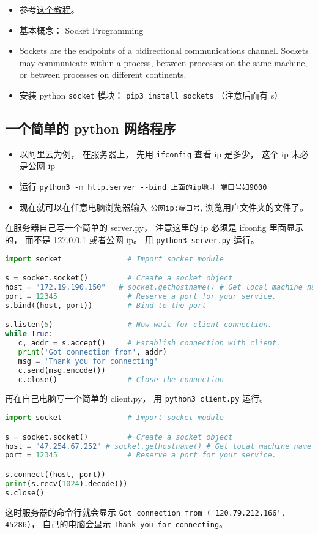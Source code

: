 
\begin{itemize}
\item 参考\href{https://www.tutorialspoint.com/python/python_networking.htm}{这个教程}。
\item 基本概念： Socket Programming
\item Sockets are the endpoints of a bidirectional communications channel. Sockets may communicate within a process, between processes on the same machine, or between processes on different continents.
\item 安装 python \verb`socket` 模块： \verb`pip3 install sockets` （注意后面有 s）
\end{itemize}

\subsection{一个简单的 python 网络程序}
\begin{itemize}
\item 以阿里云为例， 在服务器上， 先用 \verb`ifconfig` 查看 ip 是多少， 这个 ip 未必是公网 ip
\item 运行 \verb`python3 -m http.server --bind 上面的ip地址 端口号如9000`
\item 现在就可以在任意电脑浏览器输入 \verb`公网ip:端口号`, 浏览用户文件夹的文件了。
\end{itemize}

在服务器自己写一个简单的 server.py， 注意这里的 ip 必须是 ifconfig 里面显示的， 而不是 127.0.0.1 或者公网 ip。 用 \verb`python3 server.py` 运行。
\begin{lstlisting}[language=python, caption=server.py]
import socket               # Import socket module

s = socket.socket()         # Create a socket object
host = "172.19.190.150"   # socket.gethostname() # Get local machine name
port = 12345                # Reserve a port for your service.
s.bind((host, port))        # Bind to the port

s.listen(5)                 # Now wait for client connection.
while True:
   c, addr = s.accept()     # Establish connection with client.
   print('Got connection from', addr)
   msg = 'Thank you for connecting'
   c.send(msg.encode())
   c.close()                # Close the connection
\end{lstlisting}

再在自己电脑写一个简单的 client.py， 用 \verb`python3 client.py` 运行。
\begin{lstlisting}[language=python, caption=client.py]
import socket               # Import socket module

s = socket.socket()         # Create a socket object
host = "47.254.67.252" # socket.gethostname() # Get local machine name
port = 12345                # Reserve a port for your service.

s.connect((host, port))
print(s.recv(1024).decode())
s.close()
\end{lstlisting}

这时服务器的命令行就会显示 \verb`Got connection from ('120.79.212.166', 45286)`， 自己的电脑会显示 \verb`Thank you for connecting`。

